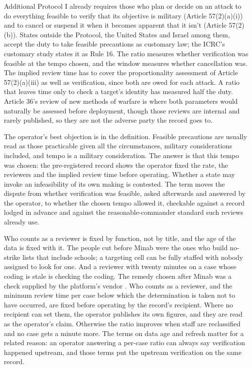 Additional Protocol I already requires those who plan or decide on an attack to do everything feasible to verify that its objective is military (Article 57(2)(a)(i)) and to cancel or suspend it when it becomes apparent that it isn't (Article 57(2)(b)). States outside the Protocol, the United States and Israel among them, accept the duty to take feasible precautions as customary law; the ICRC's customary study states it as Rule 16. The ratio measures whether verification was feasible at the tempo chosen, and the window measures whether cancellation was. The implied review time has to cover the proportionality assessment of Article 57(2)(a)(iii) as well as verification, since both are owed for each attack. A ratio that leaves time only to check a target's identity has measured half the duty. Article 36's review of new methods of warfare is where both parameters would naturally be assessed before deployment, though those reviews are internal and rarely published, so they are not the adverse party the record goes to.

The operator's best objection is in the definition. Feasible precautions are usually read as those practicable given all the circumstances, military considerations included, and tempo is a military consideration. The answer is that this tempo was chosen: the pre-registered record shows the operator fixed the rate, the reviewers and the implied review time before operating. Whether a state may invoke an infeasibility of its own making is contested. The term moves the dispute from whether verification was feasible, asked afterwards and answered by the operator, to whether the chosen tempo allowed it, checkable against a record lodged in advance and against the reasonable-commander standard such reviews already use.

Who counts as a reviewer is fixed by function, not by title, and the age of the data is fixed with it. The people cut before Minab were the ones who build no-strike lists that include schools; a targeting cell can be fully staffed with nobody assigned to look for one. And a reviewer with twenty minutes on a case whose coding is stale is checking the coding. The remedy chosen after Minab was a check supplied by the platform's vendor \autocite{Bloomberg2026KillChain}. Who counts as a reviewer, and the minimum review time per case below which the determination is taken not to have occurred, are fixed before operating by the record's recipient. Where no recipient can set them, the operator publishes its own figures, and they are read as the operator's claim. Otherwise the ratio improves when staff are reclassified and no case gets a minute more. The terms on data age and refresh matter for a related reason: an operator answering a per-case ratio can always say verification happened upstream, and those terms put the upstream verification on the same record.

